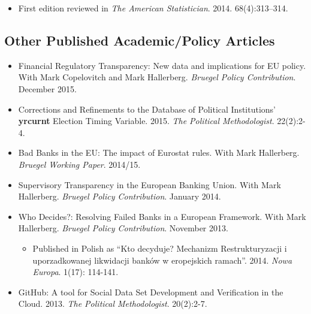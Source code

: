 \documentclass[a4paper]{article}
\begin{document}
{\begin{itemize}
        \begin{itemize}
            \item First edition reviewed in \emph{The American Statistician}. 2014. 68(4):313--314.
        \end{itemize}

\end{itemize}

\subsection*{Other Published Academic/Policy Articles}

\begin{itemize}

    \item Financial Regulatory Transparency: New data and implications for EU policy. With Mark Copelovitch and Mark Hallerberg. \emph{Bruegel Policy Contribution}. December 2015.

    \item Corrections and Refinements to the Database of Political Institutions' \textbf{yrcurnt} Election Timing Variable. 2015. {\emph{The Political Methodologist}}. 22(2):2-4.

    \item Bad Banks in the EU: The impact of Eurostat rules. With Mark Hallerberg. \emph{Bruegel Working Paper}. 2014/15.

    \item Supervisory Transparency in the European Banking Union. With Mark Hallerberg. {\emph{Bruegel Policy Contribution}}. January 2014.

    \item Who Decides?: Resolving Failed Banks in a European Framework. With Mark Hallerberg. {\emph{Bruegel Policy Contribution}}. November 2013.

      \begin{itemize}
        \item Published in Polish as ``Kto decyduje? Mechanizm Restrukturyzacji i uporzadkowanej likwidacji bank\'{o}w w eropejskich ramach''. 2014. \emph{Nowa Europa}. 1(17): 114-141.
      \end{itemize}

    \item GitHub: A tool for Social Data Set Development and Verification in the Cloud. 2013. {\emph{The Political Methodologist}}. 20(2):2-7.

\end{itemize}


}
\end{document}
